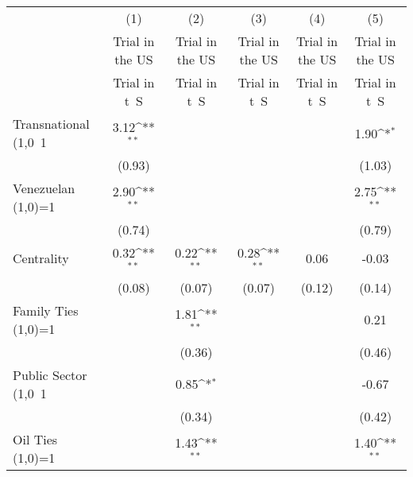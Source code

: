 {
\def\sym#1{\ifmmode^{#1}\else\(^{#1}\)\fi}
\begin{tabular}{l*{5}{c}}
\hline\hline
                    &\multicolumn{1}{c}{(1)}&\multicolumn{1}{c}{(2)}&\multicolumn{1}{c}{(3)}&\multicolumn{1}{c}{(4)}&\multicolumn{1}{c}{(5)}\\
                    &\multicolumn{1}{c}{Trial in the US}&\multicolumn{1}{c}{Trial in the US}&\multicolumn{1}{c}{Trial in the US}&\multicolumn{1}{c}{Trial in the US}&\multicolumn{1}{c}{Trial in the US}\\
                    &Trial in t~S        &Trial in t~S        &Trial in t~S        &Trial in t~S        &Trial in t~S        \\

Transnational (1,0~1&        3.12\sym{**}&                    &                    &                    &        1.90\sym{*} \\
                    &      (0.93)        &                    &                    &                    &      (1.03)        \\
Venezuelan (1,0)=1  &        2.90\sym{**}&                    &                    &                    &        2.75\sym{**}\\
                    &      (0.74)        &                    &                    &                    &      (0.79)        \\
Centrality          &        0.32\sym{**}&        0.22\sym{**}&        0.28\sym{**}&        0.06        &       -0.03        \\
                    &      (0.08)        &      (0.07)        &      (0.07)        &      (0.12)        &      (0.14)        \\
Family Ties (1,0)=1 &                    &        1.81\sym{**}&                    &                    &        0.21        \\
                    &                    &      (0.36)        &                    &                    &      (0.46)        \\
Public Sector (1,0~1&                    &        0.85\sym{*} &                    &                    &       -0.67        \\
                    &                    &      (0.34)        &                    &                    &      (0.42)        \\
Oil Ties (1,0)=1    &                    &        1.43\sym{**}&                    &                    &        1.40\sym{**}\\

\end{tabular}}
